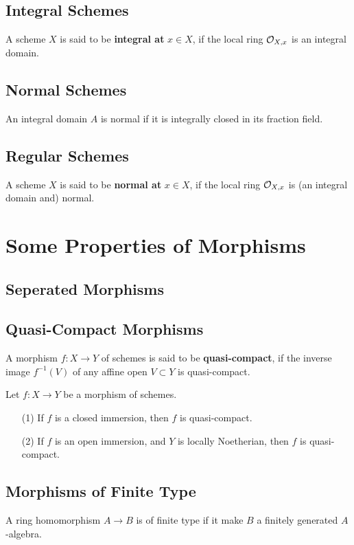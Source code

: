 \subsection{Integral Schemes}
A scheme $X$ is said to be \textbf{integral at} $x\in X$, if the local ring $\mathcal{O}_{X, x}$ is an integral domain.

\subsection{Normal Schemes}
An integral domain $A$ is normal if it is integrally closed in its fraction field.

\subsection{Regular Schemes}



A scheme $X$ is said to be \textbf{normal at}
$x\in X$, if the local ring $\mathcal{O}_{X, x}$ is (an integral domain and) normal.

\section{Some Properties of Morphisms}

\subsection{Seperated Morphisms}

\subsection{Quasi-Compact Morphisms}
A morphism $f: X\to Y$ of schemes is said to be
\textbf{quasi-compact}, if the inverse image $f^{-1}(V)$ of any affine open $V\subset Y$ is quasi-compact.
\begin{proposition}
    Let $f : X\to Y$ be a morphism of schemes.
    \begin{enumerate}
    \item [(1)] If $f$ is a closed immersion, then $f$ is quasi-compact.
    \item [(2)] If $f$ is an open immersion, and $Y$ is locally Noetherian, then $f$ is quasi-compact.
    \end{enumerate}
\end{proposition}


\subsection{Morphisms of Finite Type}
A ring homomorphism $A\to B$ is of finite type if it make $B$ a finitely generated $A$-algebra. 

